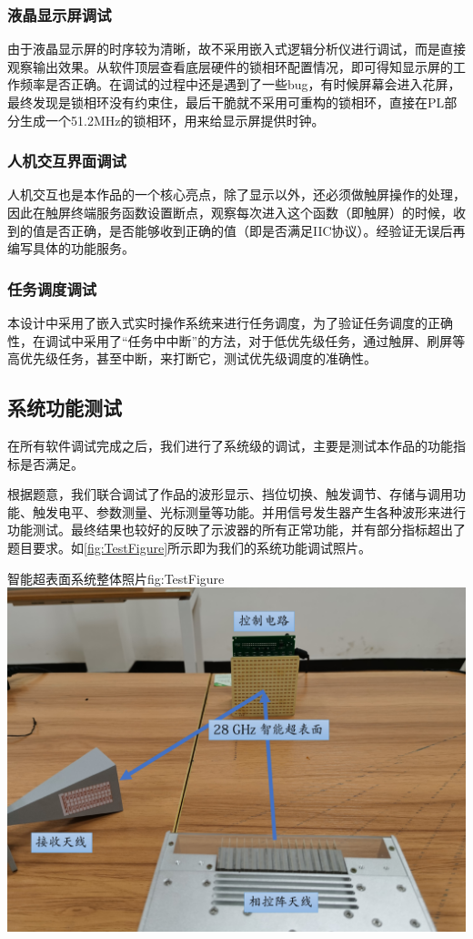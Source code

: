 \documentclass[supercite]{HustGraduPaper}
\begin{document}
\subsubsection{液晶显示屏调试}

由于液晶显示屏的时序较为清晰，故不采用嵌入式逻辑分析仪进行调试，而是直接观察输出效果。从软件顶层查看底层硬件的锁相环配置情况，即可得知显示屏的工作频率是否正确。在调试的过程中还是遇到了一些bug，有时候屏幕会进入花屏，最终发现是锁相环没有约束住，最后干脆就不采用可重构的锁相环，直接在PL部分生成一个51.2MHz的锁相环，用来给显示屏提供时钟。


\subsubsection{人机交互界面调试}
人机交互也是本作品的一个核心亮点，除了显示以外，还必须做触屏操作的处理，因此在触屏终端服务函数设置断点，观察每次进入这个函数（即触屏）的时候，收到的值是否正确，是否能够收到正确的值（即是否满足IIC协议）。经验证无误后再编写具体的功能服务。

\subsubsection{任务调度调试}
本设计中采用了嵌入式实时操作系统来进行任务调度，为了验证任务调度的正确性，在调试中采用了“任务中中断”的方法，对于低优先级任务，通过触屏、刷屏等高优先级任务，甚至中断，来打断它，测试优先级调度的准确性。

\subsection{系统功能测试}
在所有软件调试完成之后，我们进行了系统级的调试，主要是测试本作品的功能指标是否满足。

根据题意，我们联合调试了作品的波形显示、挡位切换、触发调节、存储与调用功能、触发电平、参数测量、光标测量等功能。并用信号发生器产生各种波形来进行功能测试。最终结果也较好的反映了示波器的所有正常功能，并有部分指标超出了题目要求。如\autoref{fig:TestFigure}所示即为我们的系统功能调试照片。

\begin{generalfig}[htb]{智能超表面系统整体照片}{fig:TestFigure}
	\includegraphics[width=0.8\linewidth]{Figures/TestFigure.pdf}
\end{generalfig}
\end{document}
